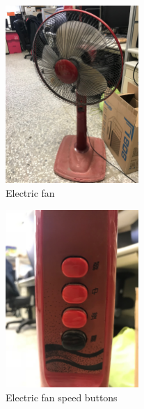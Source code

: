\documentclass[12pt, a4paper, onside]{article}
\begin{document}
\begin{figure}[h]
  \centering
  \includegraphics[angle=-90, origin=c, width=0.45\textwidth]{img/2_pic_elecric_fan}
  \caption{Electric fan}
\end{figure}
\begin{figure}[h]
  \centering
  \includegraphics[angle=-90, origin=c, width=0.45\textwidth]{img/2_pic_electric_fan_speed_button}
  \caption{Electric fan speed buttons}
\end{figure}

\clearpage
\end{document}
